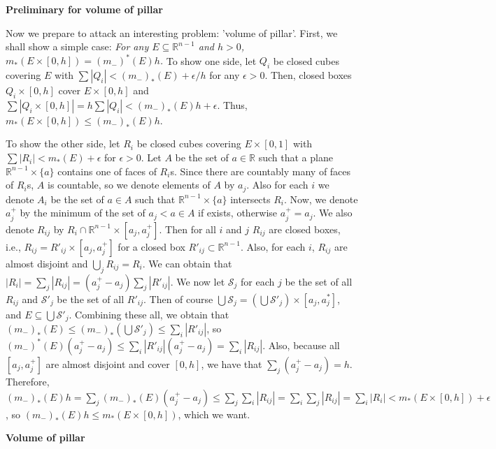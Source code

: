\documentclass{article}
\newcommand{\ReR}{\mathbb{R}}
\begin{document}
\textbf{Preliminary for volume of pillar}

Now we prepare to attack an interesting problem: 'volume of pillar'.
First, we shall show a simple case: \textit{For any $E \subseteq \ReR^{n - 1}$ and $h > 0$, $m_*(E \times [0, h]) = (m_-)^*(E) h$.}
To show one side, let $Q_i$ be closed cubes covering $E$ with $\sum |Q_i| < (m_-)_*(E) + \epsilon / h$ for any $\epsilon > 0$.
Then, closed boxes $Q_i \times [0, h]$ cover $E \times [0, h]$ and $\sum |Q_i \times [0, h]| = h \sum |Q_i| < (m_-)_*(E) h + \epsilon$.
Thus, $m_*(E \times [0, h]) \le (m_-)_*(E) h$.

To show the other side, let $R_i$ be closed cubes covering $E \times [0, 1]$ with $\sum |R_i| < m_*(E) + \epsilon$ for $\epsilon > 0$.
Let $A$ be the set of $a \in \ReR$ such that a plane $\ReR^{n - 1} \times \{ a \}$ contains one of faces of $R_i$s.
Since there are countably many of faces of $R_i$s, $A$ is countable, so we denote elements of $A$ by $a_j$.
Also for each $i$ we denote $A_i$ be the set of $a \in A$ such that $\ReR^{n - 1} \times \{ a\}$ intersects $R_i$.
Now, we denote $a^+_j$ by the minimum of the set of $a_j < a \in A$ if exists, otherwise $a^+_j = a_j$.
We also denote $R_{ij}$ by $R_i \cap \ReR^{n - 1} \times [a_j, a^+_j]$.
Then for all $i$ and $j$ $R_{ij}$ are closed boxes, i.e., $R_{ij} = R'_{ij} \times [a_j, a^+_j]$ for a closed box $R'_{ij} \subset \ReR^{n - 1}$.
Also, for each $i$, $R_{ij}$ are almost disjoint and $\bigcup_j R_{ij} = R_i$.
We can obtain that $|R_i| = \sum_j |R_{ij}| = (a^+_j - a_j) \sum_j |R'_{ij}|$.
We now let $\mathcal{S}_j$ for each $j$ be the set of all $R_{ij}$ and $\mathcal{S}'_j$ be the set of all $R'_{ij}$.
Then of course $\bigcup \mathcal{S}_j = \left( \bigcup \mathcal{S}'_j \right) \times [a_j, a^*_j]$, and $E \subseteq \bigcup \mathcal{S}'_j$.
Combining these all, we obtain that $(m_-)_*(E) \le (m_-)_*\left( \bigcup \mathcal{S}'_j \right) \le \sum_i |R'_{ij}|$, so $(m_-)^*(E) (a^+_j - a_j) \le \sum_i |R'_{ij}| (a^+_j - a_j) = \sum_i |R_{ij}|$.
Also, because all $[a_j, a^+_j]$ are almost disjoint and cover $[0, h]$, we have that $\sum_j (a^+_j - a_j) = h$.
Therefore, $(m_-)_*(E) h = \sum_j (m_-)_*(E) (a^+_j - a_j) \le \sum_j \sum_i |R_{ij}| = \sum_i \sum_j |R_{ij}| = \sum_i |R_i| < m_*(E \times [0, h]) + \epsilon$, so $(m_-)_*(E) h \le m_*(E \times [0, h])$, which we want.

\newpage

\textbf{Volume of pillar}
\end{document}
